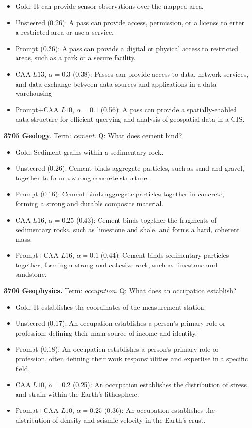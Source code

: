 \begin{itemize}\setlength{\itemsep}{0.15em}\setlength{\parsep}{0pt}\setlength{\topsep}{0.2em}
\item Gold: It can provide sensor observations over the mapped area.
\item Unsteered (0.26): A pass can provide access, permission, or a license to enter a restricted area or use a service.
\item Prompt (0.26): A pass can provide a digital or physical access to restricted areas, such as a park or a secure facility.
\item CAA $L13$, $\alpha=0.3$ (0.38): Passes can provide access to data, network services, and data exchange between data sources and applications in a data warehousing
\item Prompt+CAA $L10$, $\alpha=0.1$ (0.56): A pass can provide a spatially-enabled data structure for efficient querying and analysis of geospatial data in a GIS.
\end{itemize}
\medskip\noindent\textbf{3705 Geology.} Term: \emph{cement}.
Q: What does cement bind?
\begin{itemize}\setlength{\itemsep}{0.15em}\setlength{\parsep}{0pt}\setlength{\topsep}{0.2em}
\item Gold: Sediment grains within a sedimentary rock.
\item Unsteered (0.26): Cement binds aggregate particles, such as sand and gravel, together to form a strong concrete structure.
\item Prompt (0.16): Cement binds aggregate particles together in concrete, forming a strong and durable composite material.
\item CAA $L16$, $\alpha=0.25$ (0.43): Cement binds together the fragments of sedimentary rocks, such as limestone and shale, and forms a hard, coherent mass.
\item Prompt+CAA $L16$, $\alpha=0.1$ (0.44): Cement binds sedimentary particles together, forming a strong and cohesive rock, such as limestone and sandstone.
\end{itemize}
\medskip\noindent\textbf{3706 Geophysics.} Term: \emph{occupation}.
Q: What does an occupation establish?
\begin{itemize}\setlength{\itemsep}{0.15em}\setlength{\parsep}{0pt}\setlength{\topsep}{0.2em}
\item Gold: It establishes the coordinates of the measurement station.
\item Unsteered (0.17): An occupation establishes a person's primary role or profession, defining their main source of income and identity.
\item Prompt (0.18): An occupation establishes a person's primary role or profession, often defining their work responsibilities and expertise in a specific field.
\item CAA $L10$, $\alpha=0.2$ (0.25): An occupation establishes the distribution of stress and strain within the Earth's lithosphere.
\item Prompt+CAA $L10$, $\alpha=0.25$ (0.36): An occupation establishes the distribution of density and seismic velocity in the Earth's crust.
\end{itemize}

